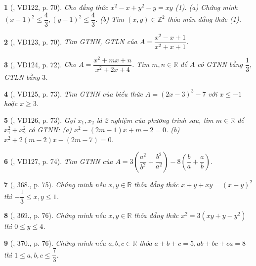 \documentclass{article}
\newtheorem{baitoan}{}
\begin{document}
\begin{baitoan}[\cite{Binh_Toan_9_tap_2}, VD122, p. 70]
	Cho đẳng thức $x^2 - x + y^2 - y = xy$ {\rm(1)}. (a) Chứng minh $(x - 1)^2\le\dfrac{4}{3},(y - 1)^2\le\dfrac{4}{3}$. (b) Tìm $(x,y)\in\mathbb{Z}^2$ thỏa mãn đẳng thức {\rm(1)}.
\end{baitoan}

\begin{baitoan}[\cite{Binh_Toan_9_tap_2}, VD123, p. 70]
	Tìm {\rm GTNN, GTLN} của $A = \dfrac{x^2 - x + 1}{x^2 + x + 1}$.
\end{baitoan}

\begin{baitoan}[\cite{Binh_Toan_9_tap_2}, VD124, p. 72]
	Cho $A = \dfrac{x^2 + mx + n}{x^2 + 2x + 4}$. Tìm $m,n\in\mathbb{R}$ để $A$ có {\rm GTNN} bằng $\dfrac{1}{3}$, {\rm GTLN} bằng $3$.
\end{baitoan}

\begin{baitoan}[\cite{Binh_Toan_9_tap_2}, VD125, p. 73]
	Tìm {\rm GTNN} của biểu thức $A = (2x - 3)^3 - 7$ với $x\le-1$ hoặc $x\ge3$.
\end{baitoan}

\begin{baitoan}[\cite{Binh_Toan_9_tap_2}, VD126, p. 73]
	Gọi $x_1,x_2$ là 2 nghiệm của phương trình sau, tìm $m\in\mathbb{R}$ để $x_1^2 + x_2^2$ có {\rm GTNN}: (a) $x^2 - (2m - 1)x + m - 2 = 0$. (b) $x^2 + 2(m - 2)x - (2m - 7) = 0$.
\end{baitoan}

\begin{baitoan}[\cite{Binh_Toan_9_tap_2}, VD127, p. 74]
	Tìm {\rm GTNN} của $A = 3\left(\dfrac{a^2}{b^2} + \dfrac{b^2}{a^2}\right) - 8\left(\dfrac{b}{a} + \dfrac{a}{b}\right)$.
\end{baitoan}

\begin{baitoan}[\cite{Binh_Toan_9_tap_2}, 368., p. 75]
	Chứng minh nếu $x,y\in\mathbb{R}$ thỏa đẳng thức $x + y + xy = (x + y)^2$ thì $-\dfrac{1}{3}\le x,y\le1$.
\end{baitoan}

\begin{baitoan}[\cite{Binh_Toan_9_tap_2}, 369., p. 76]
	Chứng minh nếu $x,y\in\mathbb{R}$ thỏa đẳng thức $x^2 = 3(xy + y - y^2)$ thì $0\le y\le4$.
\end{baitoan}

\begin{baitoan}[\cite{Binh_Toan_9_tap_2}, 370., p. 76]
	Chứng minh nếu $a,b,c\in\mathbb{R}$ thỏa $a + b + c = 5,ab + bc + ca = 8$ thì $1\le a,b,c\le\dfrac{7}{3}$.
\end{baitoan}
\end{document}
